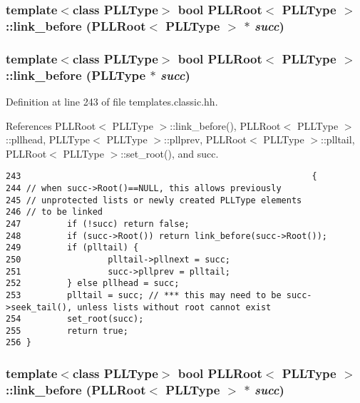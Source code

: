 \subsubsection{\setlength{\rightskip}{0pt plus 5cm}template$<$class PLLType$>$ bool PLLRoot$<$ {\bf PLLType} $>$::link\_\-before (PLLRoot$<$ {\bf PLLType} $>$ $\ast$ {\em succ})\hspace{0.3cm}{\tt  [inline]}}\label{classPLLRoot_a25}


\subsubsection{\setlength{\rightskip}{0pt plus 5cm}template$<$class PLLType$>$ bool PLLRoot$<$ {\bf PLLType} $>$::link\_\-before ({\bf PLLType} $\ast$ {\em succ})\hspace{0.3cm}{\tt  [inline]}}\label{classPLLRoot_a9}




Definition at line 243 of file templates.classic.hh.

References PLLRoot$<$ PLLType $>$::link\_\-before(), PLLRoot$<$ PLLType $>$::pllhead, PLLType$<$ PLLType $>$::pllprev, PLLRoot$<$ PLLType $>$::plltail, PLLRoot$<$ PLLType $>$::set\_\-root(), and succ.



\footnotesize\begin{verbatim}243                                                         { 
244 // when succ->Root()==NULL, this allows previously
245 // unprotected lists or newly created PLLType elements
246 // to be linked
247         if (!succ) return false; 
248         if (succ->Root()) return link_before(succ->Root()); 
249         if (plltail) { 
250                 plltail->pllnext = succ;
251                 succ->pllprev = plltail; 
252         } else pllhead = succ; 
253         plltail = succ; // *** this may need to be succ->seek_tail(), unless lists without root cannot exist
254         set_root(succ); 
255         return true; 
256 } 
\end{verbatim}\normalsize 
{}
\subsubsection{\setlength{\rightskip}{0pt plus 5cm}template$<$class PLLType$>$ bool PLLRoot$<$ {\bf PLLType} $>$::link\_\-before (PLLRoot$<$ {\bf PLLType} $>$ $\ast$ {\em succ})\hspace{0.3cm}{\tt  [inline]}}\label{classPLLRoot_a8}




